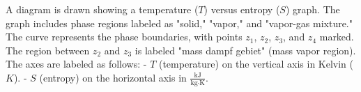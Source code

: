 A diagram is drawn showing a temperature (\( T \)) versus entropy (\( S \)) graph. The graph includes phase regions labeled as "solid," "vapor," and "vapor-gas mixture." The curve represents the phase boundaries, with points \( z_1 \), \( z_2 \), \( z_3 \), and \( z_4 \) marked. The region between \( z_2 \) and \( z_3 \) is labeled "mass dampf gebiet" (mass vapor region). The axes are labeled as follows:  
- \( T \) (temperature) on the vertical axis in Kelvin (\( K \)).  
- \( S \) (entropy) on the horizontal axis in \( \frac{\text{kJ}}{\text{kg·K}} \).